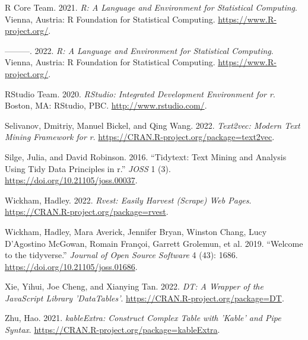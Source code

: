 \documentclass[
  letterpaper,
]{report}
\newlength{\cslhangindent}
\newlength{\cslentryspacingunit} %
\newenvironment{CSLReferences}[2] %
 {%
  \setlength{\parindent}{0pt}
  \ifodd #1
  \let\oldpar\par
  \def\par{\hangindent=\cslhangindent\oldpar}
  \fi
  \setlength{\parskip}{#2\cslentryspacingunit}
 }%
 {}
\begin{document}
\begin{CSLReferences}{1}{0}
\leavevmode{}%
R Core Team. 2021. \emph{R: A Language and Environment for Statistical
Computing}. Vienna, Austria: R Foundation for Statistical Computing.
\url{https://www.R-project.org/}.

\leavevmode{}%
---------. 2022. \emph{R: A Language and Environment for Statistical
Computing}. Vienna, Austria: R Foundation for Statistical Computing.
\url{https://www.R-project.org/}.

\leavevmode{}%
RStudio Team. 2020. \emph{RStudio: Integrated Development Environment
for r}. Boston, MA: RStudio, PBC. \url{http://www.rstudio.com/}.

\leavevmode{}%
Selivanov, Dmitriy, Manuel Bickel, and Qing Wang. 2022. \emph{Text2vec:
Modern Text Mining Framework for r}.
\url{https://CRAN.R-project.org/package=text2vec}.

\leavevmode{}%
Silge, Julia, and David Robinson. 2016. {``Tidytext: Text Mining and
Analysis Using Tidy Data Principles in r.''} \emph{JOSS} 1 (3).
\url{https://doi.org/10.21105/joss.00037}.

\leavevmode{}%
Wickham, Hadley. 2022. \emph{Rvest: Easily Harvest (Scrape) Web Pages}.
\url{https://CRAN.R-project.org/package=rvest}.

\leavevmode{}%
Wickham, Hadley, Mara Averick, Jennifer Bryan, Winston Chang, Lucy
D'Agostino McGowan, Romain Françoi, Garrett Grolemun, et al. 2019.
{``Welcome to the {tidyverse}.''} \emph{Journal of Open Source Software}
4 (43): 1686. \url{https://doi.org/10.21105/joss.01686}.

\leavevmode{}%
Xie, Yihui, Joe Cheng, and Xianying Tan. 2022. \emph{DT: A Wrapper of
the JavaScript Library 'DataTables'}.
\url{https://CRAN.R-project.org/package=DT}.

\leavevmode{}%
Zhu, Hao. 2021. \emph{kableExtra: Construct Complex Table with 'Kable'
and Pipe Syntax}. \url{https://CRAN.R-project.org/package=kableExtra}.

\end{CSLReferences}
\end{document}
